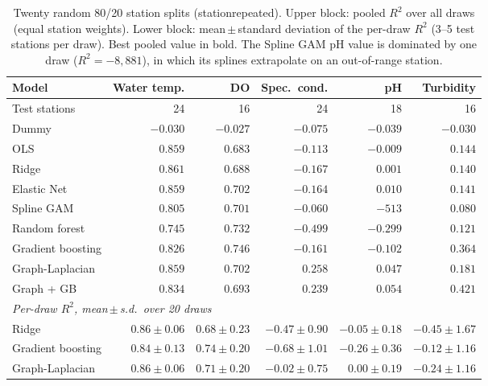 \documentclass[11pt]{article}
\newcommand{\codeus}{\textunderscore\allowbreak}
\newcommand{\code}[1]{{\ttfamily\let\_\codeus #1}}
\begin{document}
\begin{table}[h]
\centering
\small
\caption{Twenty random 80/20 station splits (\code{station\_repeated}). Upper block: pooled $R^2$
over all draws (equal station weights). Lower block: mean\,$\pm$\,standard deviation of the
per-draw $R^2$ (3--5 test stations per draw). Best pooled value in bold. The Spline GAM pH value is
dominated by one draw ($R^2=-8{,}881$), in which its splines extrapolate on an out-of-range station.}
\label{tab:split_repeated}
\begin{tabular}{l rrrrr}
\toprule
Model & Water temp. & DO & Spec.\ cond. & pH & Turbidity \\
\midrule
Test stations & 24 & 16 & 24 & 18 & 16 \\ \midrule
Dummy               & $-0.030$ & $-0.027$ & $-0.075$ & $-0.039$ & $-0.030$ \\
OLS                 & $0.859$ & $0.683$ & $-0.113$ & $-0.009$ & $0.144$ \\
Ridge               & $\mathbf{0.861}$ & $0.688$ & $-0.167$ & $0.001$ & $0.140$ \\
Elastic Net         & $0.859$ & $0.702$ & $-0.164$ & $0.010$ & $0.141$ \\
Spline GAM          & $0.805$ & $0.701$ & $-0.060$ & $-513$ & $0.080$ \\
Random forest       & $0.745$ & $0.732$ & $-0.499$ & $-0.299$ & $0.121$ \\
Gradient boosting   & $0.826$ & $\mathbf{0.746}$ & $-0.161$ & $-0.102$ & $0.364$ \\
Graph-Laplacian     & $0.859$ & $0.702$ & $\mathbf{0.258}$ & $0.047$ & $0.181$ \\
Graph + GB          & $0.834$ & $0.693$ & $0.239$ & $\mathbf{0.054}$ & $\mathbf{0.421}$ \\
\midrule
\multicolumn{6}{l}{\emph{Per-draw $R^2$, mean\,$\pm$\,s.d.\ over 20 draws}} \\
Ridge               & $0.86\pm0.06$ & $0.68\pm0.23$ & $-0.47\pm0.90$ & $-0.05\pm0.18$ & $-0.45\pm1.67$ \\
Gradient boosting   & $0.84\pm0.13$ & $0.74\pm0.20$ & $-0.68\pm1.01$ & $-0.26\pm0.36$ & $-0.12\pm1.16$ \\
Graph-Laplacian     & $0.86\pm0.06$ & $0.71\pm0.20$ & $-0.02\pm0.75$ & $0.00\pm0.19$ & $-0.24\pm1.16$ \\
\bottomrule
\end{tabular}
\end{table}
\end{document}
